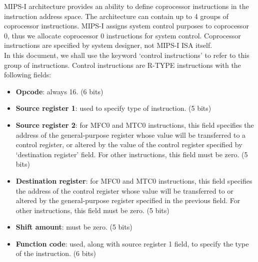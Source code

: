 \documentclass[]{scrartcl}
\begin{document}
MIPS-I architecture provides an ability to define coprocessor instructions
in the instruction address space. The architecture can contain up to 4
groups of coprocessor instructions. MIPS-I assigns system control
purposes to coprocessor 0, thus we allocate coprocessor 0 instructions
for system control. Coprocessor instructions are specified by system
designer, not MIPS-I ISA itself.\\

In this document, we shall use the keyword `control instructions' to
refer to this group of instructions. Control instructions are R-TYPE
instructions with the following fields:

\begin{itemize}

\item \textbf{Opcode}: always 16. (6 bits)

\item \textbf{Source register 1}: used to specify type of instruction.
                                  (5 bits)

\item \textbf{Source register 2}: for MFC0 and MTC0 instructions,
                                  this field specifies the address of
                                  the general-purpose register whose
                                  value will be transferred to a
                                  control register, or altered by
                                  the value of the control register
                                  specified by `destination register'
                                  field. For other instructions, this
                                  field must be zero. (5 bits)

\item \textbf{Destination register}: for MFC0 and MTC0 instructions,
                                     this field specifies the address of
                                     the control register whose value
                                     will be transferred to or altered
                                     by the general-purpose register
                                     specified in the previous field.
                                     For other instructions, this field
                                     must be zero. (5 bits)

\item \textbf{Shift amount}: must be zero. (5 bits)

\item \textbf{Function code}: used, along with source register 1 field,
                              to specify the type of the instruction.
                              (6 bits)

\end{itemize}
\end{document}
